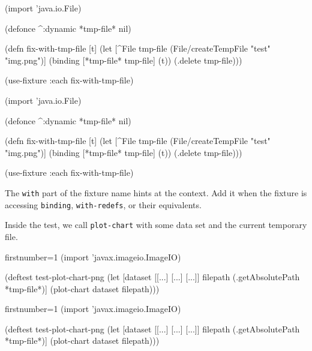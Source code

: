 \ifx\DEVICETYPE\MOBILE

\begin{english}
  \begin{clojure}
(import 'java.io.File)

(defonce ^:dynamic *tmp-file* nil)

(defn fix-with-tmp-file [t]
  (let [^File tmp-file
        (File/createTempFile
          "test" "img.png")]
    (binding [*tmp-file* tmp-file]
      (t))
    (.delete tmp-file)))

(use-fixture :each fix-with-tmp-file)
  \end{clojure}
\end{english}

\else

\begin{english}
  \begin{clojure}
(import 'java.io.File)

(defonce ^:dynamic *tmp-file* nil)

(defn fix-with-tmp-file [t]
  (let [^File tmp-file (File/createTempFile "test" "img.png")]
    (binding [*tmp-file* tmp-file]
      (t))
    (.delete tmp-file)))

(use-fixture :each fix-with-tmp-file)
  \end{clojure}
\end{english}

\fi

The \verb|with| part of the fixture name hints at the context. Add it when the fixture is accessing \verb|binding|, \verb|with-redefs|, or their equivalents.


Inside the test, we call \verb|plot-chart| with some data set and the current temporary file.

\ifx\DEVICETYPE\MOBILE

\begin{english}
  \begin{clojure/lines*}{firstnumber=1}
(import 'javax.imageio.ImageIO)

(deftest test-plot-chart-png
 (let [dataset [[...] [...] [...]]
       filepath (.getAbsolutePath
                          *tmp-file*)]
   (plot-chart dataset filepath)))
  \end{clojure/lines*}
\end{english}

\else

\begin{english}
  \begin{clojure/lines*}{firstnumber=1}
(import 'javax.imageio.ImageIO)

(deftest test-plot-chart-png
  (let [dataset [[...] [...] [...]]
        filepath (.getAbsolutePath *tmp-file*)]
    (plot-chart dataset filepath)))
  \end{clojure/lines*}
\end{english}

